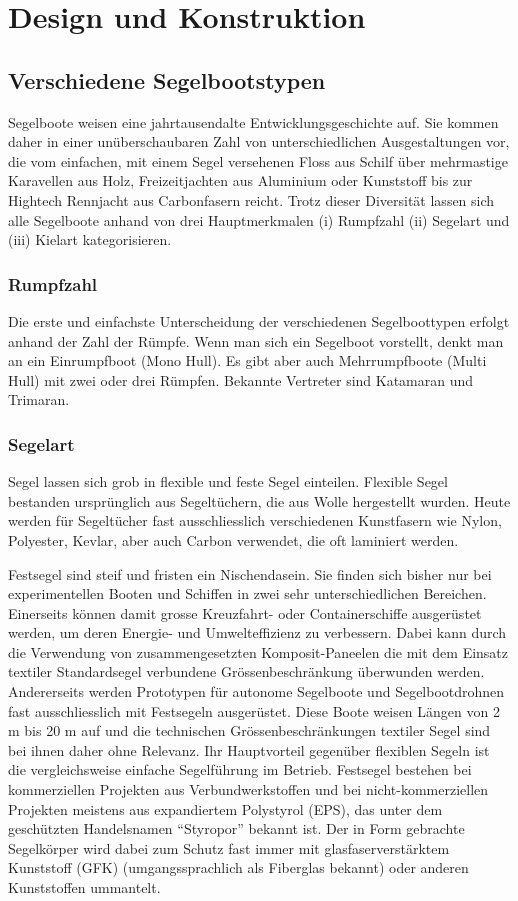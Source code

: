 


\label{chap:konstruktion}
\chapter{Design und Konstruktion}
\section{Verschiedene Segelbootstypen}
Segelboote weisen eine jahrtausendalte Entwicklungsgeschichte auf. Sie kommen daher in einer unüberschaubaren Zahl von unterschiedlichen Ausgestaltungen vor, die vom einfachen, mit einem Segel versehenen Floss aus Schilf über mehrmastige Karavellen aus Holz, Freizeitjachten aus Aluminium oder Kunststoff bis zur Hightech Rennjacht aus Carbonfasern reicht. Trotz dieser Diversität lassen sich alle Segelboote anhand von drei Hauptmerkmalen (i) Rumpfzahl (ii) Segelart und (iii) Kielart kategorisieren.
\subsection{Rumpfzahl}
Die erste und einfachste Unterscheidung der verschiedenen Segelboottypen erfolgt anhand der Zahl der Rümpfe. Wenn man sich ein Segelboot vorstellt, denkt man an ein Einrumpfboot (Mono Hull). Es gibt aber auch Mehrrumpfboote (Multi Hull) mit zwei oder drei Rümpfen. Bekannte Vertreter sind Katamaran und Trimaran.
\subsection{Segelart}
Segel lassen sich grob in flexible und feste Segel einteilen. Flexible Segel bestanden ursprünglich aus Segeltüchern, die aus Wolle hergestellt wurden. Heute werden für Segeltücher fast ausschliesslich verschiedenen Kunstfasern wie Nylon, Polyester, Kevlar, aber auch Carbon verwendet, die oft laminiert werden. 

Festsegel sind steif und fristen ein Nischendasein. Sie finden sich bisher nur bei experimentellen Booten und Schiffen in zwei sehr unterschiedlichen Bereichen. Einerseits können damit grosse Kreuzfahrt- oder Containerschiffe ausgerüstet werden, um deren Energie- und Umwelteffizienz zu verbessern. Dabei kann durch die Verwendung von zusammengesetzten Komposit-Paneelen die mit dem Einsatz textiler Standardsegel verbundene Grössenbeschränkung überwunden werden. \cite{redaktion_bv-grundsatz-zulassung_2022} Andererseits werden Prototypen für autonome Segelboote und Segelbootdrohnen fast ausschliesslich mit Festsegeln ausgerüstet. Diese Boote weisen Längen von 2 m bis 20 m auf und die technischen Grössenbeschränkungen textiler Segel sind bei ihnen daher ohne Relevanz. Ihr Hauptvorteil gegenüber flexiblen Segeln ist die vergleichsweise einfache Segelführung im Betrieb. Festsegel bestehen bei kommerziellen Projekten aus Verbundwerkstoffen und bei nicht-kommerziellen Projekten meistens aus expandiertem Polystyrol (EPS), das unter dem geschützten Handelsnamen \enquote{Styropor} bekannt ist. Der in Form gebrachte Segelkörper wird dabei zum Schutz fast immer mit glasfaserverstärktem Kunststoff (GFK) (umgangssprachlich als Fiberglas bekannt) oder anderen Kunststoffen ummantelt.
